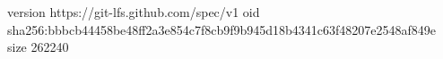 version https://git-lfs.github.com/spec/v1
oid sha256:bbbcb44458be48ff2a3e854c7f8cb9f9b945d18b4341c63f48207e2548af849e
size 262240
